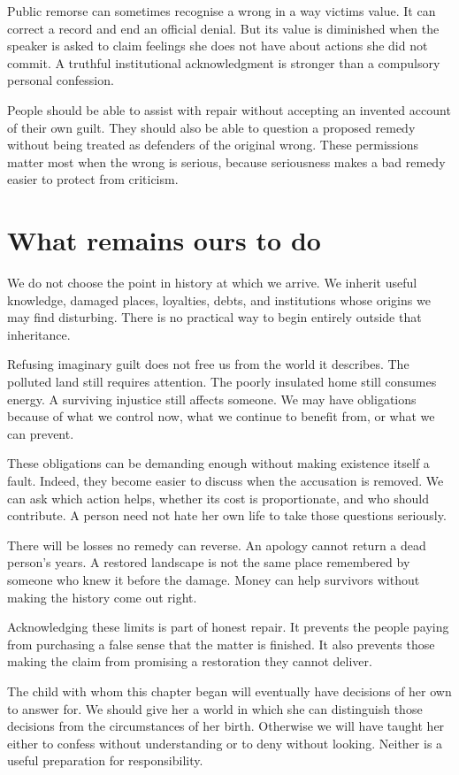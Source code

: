 \documentclass[12pt,a4paper]{book}
\begin{document}
Public remorse can sometimes recognise a wrong in a way victims value. It can correct a record and end an official denial. But its value is diminished when the speaker is asked to claim feelings she does not have about actions she did not commit. A truthful institutional acknowledgment is stronger than a compulsory personal confession.

People should be able to assist with repair without accepting an invented account of their own guilt. They should also be able to question a proposed remedy without being treated as defenders of the original wrong. These permissions matter most when the wrong is serious, because seriousness makes a bad remedy easier to protect from criticism.

\section*{What remains ours to do}

We do not choose the point in history at which we arrive. We inherit useful knowledge, damaged places, loyalties, debts, and institutions whose origins we may find disturbing. There is no practical way to begin entirely outside that inheritance.

Refusing imaginary guilt does not free us from the world it describes. The polluted land still requires attention. The poorly insulated home still consumes energy. A surviving injustice still affects someone. We may have obligations because of what we control now, what we continue to benefit from, or what we can prevent.

These obligations can be demanding enough without making existence itself a fault. Indeed, they become easier to discuss when the accusation is removed. We can ask which action helps, whether its cost is proportionate, and who should contribute. A person need not hate her own life to take those questions seriously.

There will be losses no remedy can reverse. An apology cannot return a dead person's years. A restored landscape is not the same place remembered by someone who knew it before the damage. Money can help survivors without making the history come out right.

Acknowledging these limits is part of honest repair. It prevents the people paying from purchasing a false sense that the matter is finished. It also prevents those making the claim from promising a restoration they cannot deliver.

The child with whom this chapter began will eventually have decisions of her own to answer for. We should give her a world in which she can distinguish those decisions from the circumstances of her birth. Otherwise we will have taught her either to confess without understanding or to deny without looking. Neither is a useful preparation for responsibility.
\end{document}
